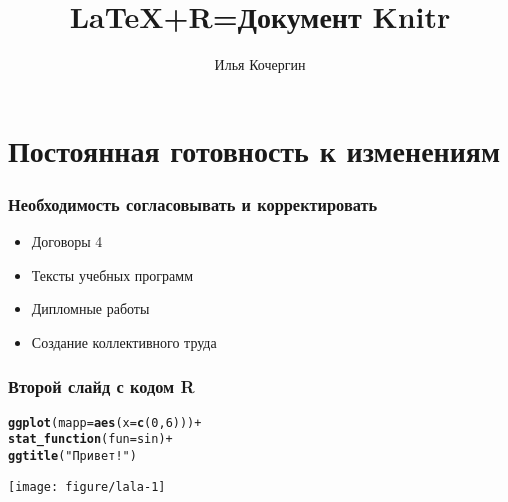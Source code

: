 \documentclass[10pt,pdf]{beamer}\usepackage[]{graphicx}\usepackage[]{color}
\title{LaTeX+R=Документ Knitr}
\author{Илья Кочергин}
\institute{кафедра экономической информатики ЭФ МГУ}
\makeatletter
\newcommand{\hlnum}[1]{\textcolor[rgb]{0.686,0.059,0.569}{#1}}%
\newcommand{\hlstr}[1]{\textcolor[rgb]{0.192,0.494,0.8}{#1}}%
\newcommand{\hlopt}[1]{\textcolor[rgb]{0,0,0}{#1}}%
\newcommand{\hlstd}[1]{\textcolor[rgb]{0.345,0.345,0.345}{#1}}%
\newcommand{\hlkwc}[1]{\textcolor[rgb]{0.333,0.667,0.333}{#1}}%
\newcommand{\hlkwd}[1]{\textcolor[rgb]{0.737,0.353,0.396}{\textbf{#1}}}%
\newenvironment{kframe}{%
 \def\at@end@of@kframe{}%
 \ifinner\ifhmode%
  \def\at@end@of@kframe{\end{minipage}}%
  \begin{minipage}{\columnwidth}%
 \fi\fi%
 \def\FrameCommand##1{\hskip\@totalleftmargin \hskip-\fboxsep
 \colorbox{shadecolor}{##1}\hskip-\fboxsep
     \hskip-\linewidth \hskip-\@totalleftmargin \hskip\columnwidth}%
 \MakeFramed {\advance\hsize-\width
   \@totalleftmargin\z@ \linewidth\hsize
   \@setminipage}}%
 {\par\unskip\endMakeFramed%
 \at@end@of@kframe}
\newenvironment{knitrout}{}{} %
\makeatother
\begin{document}
\begin{frame}

\titlepage
\end{frame}	
\section[Готовность изменять]{Постоянная готовность к изменениям}
\begin{frame}
	\frametitle{Необходимость согласовывать и корректировать}
\begin{itemize}
\item 	Договоры 4
\item 	Тексты учебных программ
\item 	Дипломные работы 
\item 	Создание коллективного  труда
\end{itemize} 
\end{frame}


\begin{frame}[fragile]
\frametitle{Второй слайд с кодом R}    


\begin{knitrout}
\color{fgcolor}\begin{kframe}
\begin{alltt}
  \hlkwd{ggplot}\hlstd{(}\hlkwc{mapp}\hlstd{=}\hlkwd{aes}\hlstd{(}\hlkwc{x}\hlstd{=}\hlkwd{c}\hlstd{(}\hlnum{0}\hlstd{,}\hlnum{6}\hlstd{)))}\hlopt{+}
  \hlkwd{stat_function}\hlstd{(}\hlkwc{fun} \hlstd{= sin)}\hlopt{+}
  \hlkwd{ggtitle}\hlstd{(}\hlstr{"Привет!"}\hlstd{)}
\end{alltt}
\end{kframe}

{\centering \texttt{[image: figure/lala-1]} 

}



\end{knitrout}

\end{frame}
\end{document}
